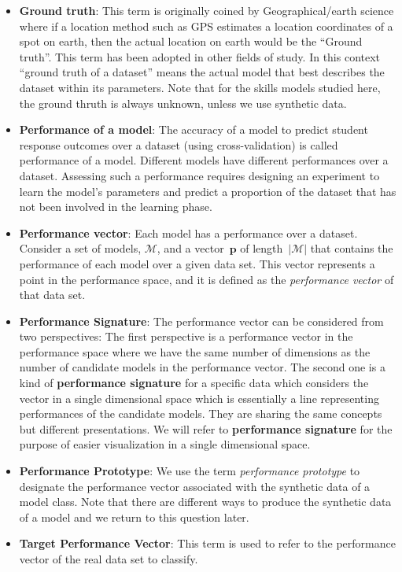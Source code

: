\begin{itemize}
\item \textbf{Ground truth}: This term is originally coined by Geographical/earth science where if a location method such as GPS estimates a location coordinates of a spot on earth, then the actual location on earth would be the ``Ground truth''. This term has been adopted in other fields of study. In this context ``ground truth of a dataset'' means the actual model that best describes the dataset within its parameters.  Note that for the skills models studied here, the ground thruth is always unknown, unless we use synthetic data.
\item \textbf{Performance of a model}: The accuracy of a model to predict student response outcomes over a dataset (using cross-validation) is called performance of a model.  Different models have different performances over a dataset. Assessing such a performance requires designing an experiment to learn the model's parameters and predict a proportion of the dataset that has not been involved in the learning phase.
\item \textbf{Performance vector}: Each model has a performance over a dataset. Consider a set of models, $\mathcal{M}$, and a vector~$\mathbf{p}$ of length~$|\mathcal{M}|$ that contains the performance of each model over a given data set.  This vector represents a point in the performance space, and it is defined as the \textit{performance vector} of that data set.

\item \textbf{Performance Signature}: The performance vector can be considered from two perspectives: The first perspective is a performance vector in the performance space where we have the same number of dimensions as the number of candidate models in the performance vector. The second one is a kind of \textbf{performance signature} for a specific data which considers the vector in a single dimensional space which is essentially a line representing performances of the candidate models.  They are sharing the same concepts but different presentations. We will refer to \textbf{performance signature} for the purpose of easier visualization in a single dimensional space.

\item \textbf{Performance Prototype}: We use the term \textit{performance prototype} to designate the performance vector associated with the synthetic data of a model class.  Note that there are different ways to produce the synthetic data of a model and we return to this question later.

\item \textbf{Target Performance Vector}: This term is used to refer to the performance vector of the real data set to classify.

\end{itemize}

